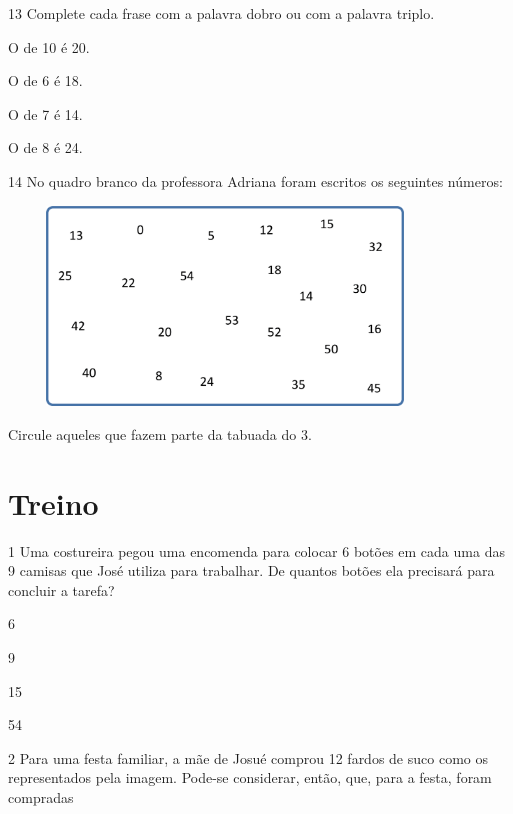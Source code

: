\num{13} Complete cada frase com a palavra dobro ou com a palavra triplo.

\begin{escolha}
\item
  O  de 10 é 20.
\item
  O  de 6 é 18.
\item
  O  de 7 é 14.
\item
  O  de 8 é 24.
\end{escolha}

\num{14} No quadro branco da professora Adriana foram escritos os seguintes números:


\includegraphics[width=4.51706in,height=2.09185in]{./media/image25.png}

Circule aqueles que fazem parte da tabuada do 3.



\section*{Treino}

\num{1} Uma costureira pegou uma encomenda para colocar 6 botões em
cada uma das 9 camisas que José utiliza para trabalhar. De quantos botões
ela precisará para concluir a tarefa?

\begin{escolha}
    \item 6
    \item 9
    \item 15
    \item 54
\end{escolha}


\num{2} Para uma festa familiar, a mãe de Josué comprou 12 fardos de
suco como os representados pela imagem. Pode-se considerar, então, que, para a festa, foram compradas

